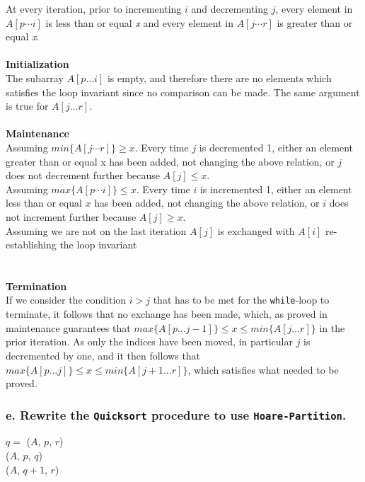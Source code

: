 \documentclass[11pt,english]{article}
\begin{document}
At every iteration, prior to incrementing $i$ and decrementing $j$, every 
element in $A[p \cdots i]$ is less than or equal \textit{x} and every 
element in $A[j \cdots r]$ is greater than or equal \textit{x}.
\\\\
\noindent \textbf{Initialization}\\
The subarray $A[p \dots i]$ is empty, and therefore there are no elements
which satisfies the loop invariant since no comparison can be made. The same
argument is true for $A[j \dots r]$.
\\\\
\noindent \textbf{Maintenance}\\
Assuming $min\{A[j \cdots r]\} \geq x$. Every time $j$ is decremented 1, 
either an element greater than or equal x has been added, not changing the 
above relation, or $j$ does not decrement further because $A[j] \leq x$. \\
Assuming $max\{A[p \cdots i]\} \leq x$. Every time $i$ is incremented 1, 
either an element less than or equal $x$ has been added, not changing the 
above relation, or $i$ does not increment further because $A[j] \geq x$. \\
Assuming we are not on the last iteration $A[j]$ is exchanged with $A[i]$ 
re-establishing the loop invariant\\
\\\\
\noindent \textbf{Termination}\\
If we consider the condition $i > j$ that has to be met for the
\texttt{while}-loop to terminate, it follows that no exchange has been made,
which, as proved in maintenance guarantees that
$max\{A[p \dots j-1]\} \leq x \leq min\{A[j \dots r]\}$ in the prior iteration.
As only the indices have been moved, in particular $j$ is decremented by one,
and it then follows that
$max\{A[p \dots j]\} \leq x \leq min\{A[j+1 \dots r]\}$, which satisfies what
needed to be proved.

\subsubsection*{\large e. \mdseries Rewrite the \texttt{Quicksort} procedure
to use \texttt{Hoare-Partition}.}
\begin{algorithm}
	
	\BlankLine
	
	{
		$q =$ \Hoare($A$, $p$, $r$) \\
		\Quicksort($A$, $p$, $q$) \\
		\Quicksort($A$, $q + 1$, $r$)
	}
\end{algorithm}
\end{document}
